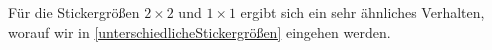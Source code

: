 \documentclass[11pt,a4paper]{article}
\newtheorem{remark}[theorem]{Bemerkung}
\numberwithin{equation}{section}
\begin{document}
	 Für die Stickergrößen $2\times 2$ und $1\times 1$ ergibt sich ein sehr ähnliches Verhalten, worauf wir in \autoref{unterschiedlicheStickergrößen} eingehen werden.
	 
	
	

	

	
	
	
\end{document}
